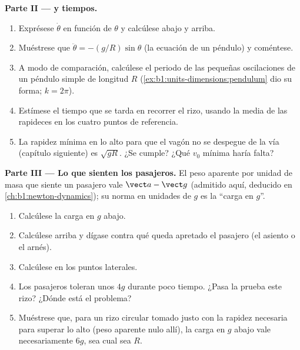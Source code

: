 \begin{problem}
\medskip
\noindent\textbf{Parte II ---  y tiempos.}
\begin{enumerate}[resume]
  \item Exprésese $\dot\theta$ en función de $\theta$ y calcúlese abajo y
        arriba.
  \item Muéstrese que $\ddot\theta = -(g/R)\sin\theta$ (la ecuación de un
        péndulo) y coméntese.
  \item A modo de comparación, calcúlese el periodo de las pequeñas
        oscilaciones de un péndulo simple de longitud $R$
        (\cref{ex:b1:units-dimensions:pendulum} dio su forma; $k = 2\pi$).
  \item Estímese el tiempo que se tarda en recorrer el rizo, usando la
        media de las rapideces en los cuatro puntos de referencia.
  \item La rapidez mínima en lo alto para que el vagón no se despegue de
        la vía (capítulo siguiente) es $\sqrt{gR}$. ¿Se cumple? ¿Qué $v_0$
        mínima haría falta?
\end{enumerate}

\medskip
\noindent\textbf{Parte III --- Lo que sienten los pasajeros.}
El peso aparente por unidad de masa que siente un pasajero vale
$\vect a - \vect g$ (admitido aquí, deducido en
\cref{ch:b1:newton-dynamics}); su norma en unidades de $g$ es la ``carga en $g$''.
\begin{enumerate}[resume]
  \item Calcúlese la carga en $g$ abajo.
  \item Calcúlese arriba y dígase contra qué queda apretado el pasajero
        (el asiento o el arnés).
  \item Calcúlese en los puntos laterales.
  \item Los pasajeros toleran unos $4g$ durante poco tiempo. ¿Pasa la
        prueba este rizo? ¿Dónde está el problema?
  \item Muéstrese que, para un rizo circular tomado justo con la rapidez
        necesaria para superar lo alto (peso aparente nulo allí), la carga
        en $g$ abajo vale necesariamente $6g$, sea cual sea $R$.
\end{enumerate}


\end{problem}
